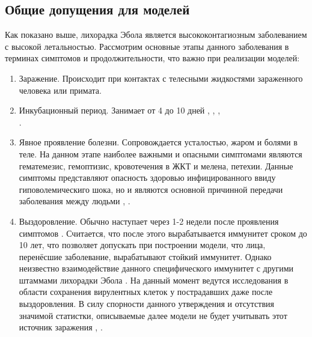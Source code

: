 \subsection{Общие допущения для моделей}
Как показано выше, лихорадка Эбола является высококонтагиозным заболеванием с высокой летальностью. Рассмотрим основные этапы данного заболевания в терминах симптомов и продолжительности, что важно при реализации моделей:
\begin{enumerate}
	\item Заражение. Происходит при контактах с телесными жидкостями зараженного человека или примата.
	\item Инкубационный период. Занимает от 4 до 10 дней \cite{WHO:2018:1}, \cite{CDC:Signs}, \cite{TheJournalOfMedicine:2014}, \\ \cite{ncbi:2014}  . %
	\item Явное проявление болезни. Сопровождается усталостью, жаром и болями в теле. На данном этапе наиболее важными  и опасными симптомами являются гематемезис, гемоптизис, кровотечения в ЖКТ и мелена, петехии. Данные симптомы представляют опасность здоровью инфицированного ввиду гиповолемическиго шока, но и являются основной причинной передачи заболевания между людьми \cite{NYTM:2014}, \cite{CDC:Transmission}. %
	\item Выздоровление. Обычно наступает через 1-2 недели после проявления симптомов 
	\cite[с. 332]{Hunter:2013}. %
	Считается, что после этого вырабатывается иммунитет сроком до 10 лет, что позволяет допускать при построении модели, что лица, перенёсшие заболевание, вырабатывают стойкий иммунитет. Однако неизвестно взаимодействие данного специфического иммунитет с другими штаммами лихорадки Эбола \cite{CDC:Transmission}. %
	На данный момент ведутся исследования в области сохранения вирулентных клеток у пострадавших даже после выздоровления. В силу спорности данного утверждения и отсутствия значимой статистки, описываемые далее модели не будет учитывать этот источник заражения \cite{WHO:semen:2016}, \cite{ScienceTime:2015}. %

\end{enumerate}
